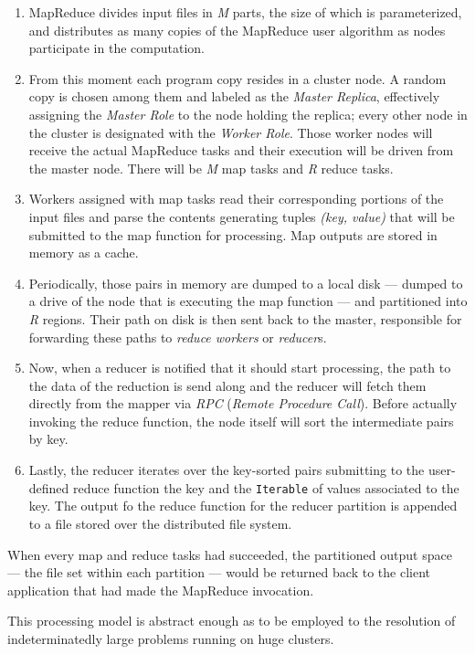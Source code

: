 \begin{enumerate}
 \item MapReduce divides input files in \emph{M} parts, the size of which is parameterized, and distributes as many copies of the MapReduce user algorithm as nodes participate in the computation.
 \item From this moment each program copy resides in a cluster node. A random copy is chosen among them and labeled as the \emph{Master Replica}, effectively assigning the \emph{Master Role} to the node holding the replica; every other node in the cluster is designated with the \emph{Worker Role}. Those worker nodes will receive the actual MapReduce tasks and their execution will be driven from the master node. There will be \emph{M} map tasks and \emph{R} reduce tasks.
 \item Workers assigned with map tasks read their corresponding portions of the input files and parse the contents generating tuples \emph{(key, value)} that will be submitted to the map function for processing. Map outputs are stored in memory as a cache.
 \item Periodically, those pairs in memory are dumped to a local disk --- dumped to a drive of the node that is executing the map function --- and partitioned into \emph{R} regions. Their path on disk is then sent back to the master, responsible for forwarding these paths to \emph{reduce workers} or \emph{reducer}s.
 \item Now, when a reducer is notified that it should start processing, the path to the data of the reduction is send along and the reducer will fetch them directly from the mapper via \emph{RPC} (\emph{Remote Procedure Call}). Before actually invoking the reduce function, the node itself will sort the intermediate pairs by key.
 \item Lastly, the reducer iterates over the key-sorted pairs submitting to the user-defined reduce function the key and the \texttt{Iterable} of values associated to the key. The output fo the reduce function for the reducer partition is appended to a file stored over the distributed file system.
\end{enumerate}

When every map and reduce tasks had succeeded, the partitioned output space --- the file set within each partition --- would be returned back to the client application that had made the MapReduce invocation.

This processing model is abstract enough as to be employed to the resolution of indeterminatedly large problems running on huge clusters.

